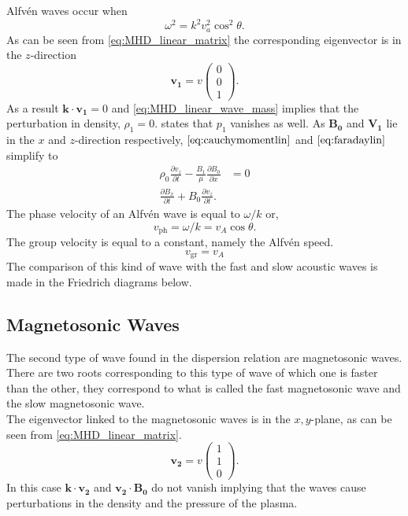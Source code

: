 \documentclass[a4paper]{article}
\numberwithin{figure}{section}
\numberwithin{equation}{section}
\begin{document}
Alfv\'en waves occur when \[
\omega^2 = k^2v_a^2\cos^2 \theta
.\] 
As can be seen from \cref{eq:MHD_linear_matrix} the corresponding eigenvector is in the $z$-direction \[
	\mathbf{v_1} = v \begin{pmatrix} 0 \\ 0 \\ 1 \end{pmatrix} 
.\] 
As a result $\mathbf k \cdot \mathbf{v_1} = 0$ and \cref{eq:MHD_linear_wave_mass} implies that the perturbation in density, $\rho_1  = 0$.  states that $p_1$ vanishes as well. 
As $\mathbf{B_0}$  and $\mathbf{V_1}$ lie in the $x$ and $z$-direction respectively, $\cref{eq:cauchymomentlin}$ and $\cref{eq:faradaylin}$ simplify to
\begin{align*}
	\rho_0 \frac{\partial v_z}{\partial t} - \frac{B_1}{\mu} \frac{\partial B_0}{\partial x} &= 0 \\
	\frac{\partial B_x}{\partial t}  + B_0\frac{\partial v_z}{\partial t} 
.\end{align*}
The phase velocity of an Alfv\'en wave is equal to $\omega/k$ or,
\begin{equation*}
    v_{\text{ph}} = \omega/k = v_A \cos\theta.
\end{equation*}
The group velocity is equal to a constant, namely the Alfv\'en speed.
\begin{equation*}
    v_{\text{gr}} = v_A
\end{equation*}
The comparison of this kind of wave with the fast and slow acoustic waves is made in the Friedrich diagrams below.
\subsection{Magnetosonic Waves}
The second type of wave found in the dispersion relation are magnetosonic waves. There are two roots corresponding to this type of wave of which one is faster than the other, they correspond to what is called the fast magnetosonic wave and the slow magnetosonic wave.\\

The eigenvector linked to the magnetosonic waves is in the $x,y$-plane, as can be seen from \cref{eq:MHD_linear_matrix}.
\[
	\mathbf{v_2} = v \begin{pmatrix} 1 \\ 1 \\ 0 \end{pmatrix} 
.\] 
In this case $\mathbf{k\cdot v_2}$ and $\mathbf{v_2 \cdot B_0}$ do not vanish implying that the waves cause perturbations in the density and the pressure of the plasma.
\end{document}
